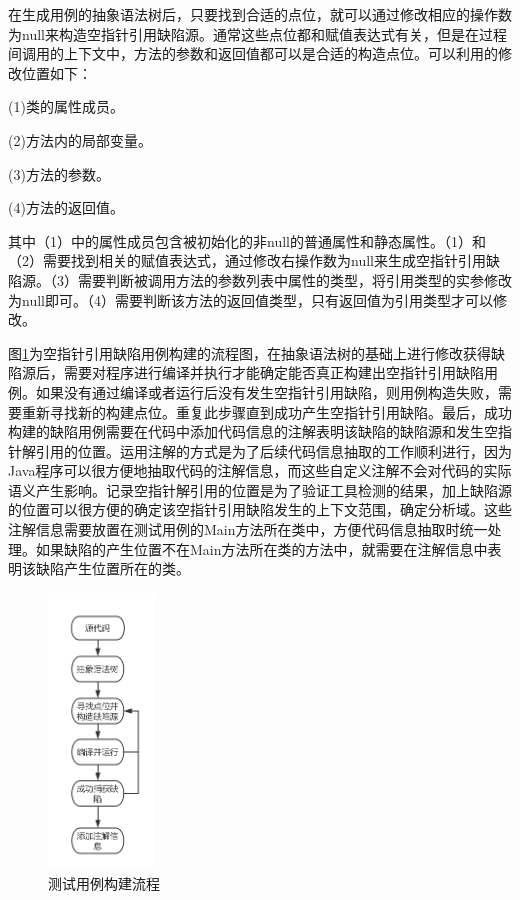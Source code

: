 在生成用例的抽象语法树后，只要找到合适的点位，就可以通过修改相应的操作数为null来构造空指针引用缺陷源。通常这些点位都和赋值表达式有关，但是在过程间调用的上下文中，方法的参数和返回值都可以是合适的构造点位。可以利用的修改位置如下：

(1)类的属性成员。

(2)方法内的局部变量。

(3)方法的参数。

(4)方法的返回值。

其中（1）中的属性成员包含被初始化的非null的普通属性和静态属性。（1）和（2）需要找到相关的赋值表达式，通过修改右操作数为null来生成空指针引用缺陷源。（3）需要判断被调用方法的参数列表中属性的类型，将引用类型的实参修改为null即可。（4）需要判断该方法的返回值类型，只有返回值为引用类型才可以修改。

图\ref{fig:figure4-3}为空指针引用缺陷用例构建的流程图，在抽象语法树的基础上进行修改获得缺陷源后，需要对程序进行编译并执行才能确定能否真正构建出空指针引用缺陷用例。如果没有通过编译或者运行后没有发生空指针引用缺陷，则用例构造失败，需要重新寻找新的构建点位。重复此步骤直到成功产生空指针引用缺陷。最后，成功构建的缺陷用例需要在代码中添加代码信息的注解表明该缺陷的缺陷源和发生空指针解引用的位置。运用注解的方式是为了后续代码信息抽取的工作顺利进行，因为Java程序可以很方便地抽取代码的注解信息，而这些自定义注解不会对代码的实际语义产生影响。记录空指针解引用的位置是为了验证工具检测的结果，加上缺陷源的位置可以很方便的确定该空指针引用缺陷发生的上下文范围，确定分析域。这些注解信息需要放置在测试用例的Main方法所在类中，方便代码信息抽取时统一处理。如果缺陷的产生位置不在Main方法所在类的方法中，就需要在注解信息中表明该缺陷产生位置所在的类。

\begin{figure}
	\centering
	\includegraphics[width=0.25\textwidth]{figures/parse4-3}
	\caption{测试用例构建流程}\label{fig:figure4-3}
\end{figure}

